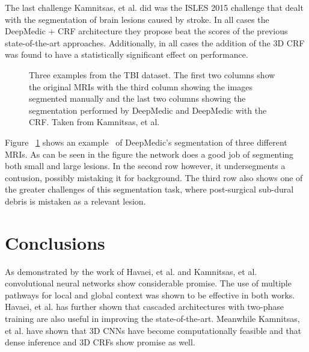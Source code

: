 \documentclass{sig-alternate}
\begin{document}
The last challenge Kamnitsas, et al. did was the ISLES 2015 challenge that dealt with the segmentation of brain lesions caused by stroke. In all cases the DeepMedic + CRF architecture they propose beat the scores of the previous state-of-the-art approaches. Additionally, in all cases the addition of the 3D CRF was found to have a statistically significant effect on performance.

\begin{figure*}
\centering
{}
\caption{Kamnitsas, et al. best performnce versus previous state-of-the-arts (BRATS 2015). The bold numbers indicate a statistically significant difference made by the CRF~\cite{Kamnitsas:2017}.}
\label{fig:KamnitsasResults}
\end{figure*}

\begin{figure}
\centering
{}
\caption{Three examples from the TBI dataset. The first two columns show the original MRIs with the third column showing the images segmented manually and the last two columns showing the segmentation performed by DeepMedic and DeepMedic with the CRF. Taken from Kamnitsas, et al.~\cite{Kamnitsas:2017}}
\label{fig:TBIVisuals}
\end{figure}

Figure ~\ref{fig:TBIVisuals} shows an example~\cite{Kamnitsas:2017} of DeepMedic's segmentation of three different MRIs. As can be seen in the figure the network does a good job of segmenting both small and large lesions. In the second row however, it undersegments a contusion, possibly mistaking it for background. The third row also shows one of the greater challenges of this segmentation task, where post-surgical sub-dural debris is mistaken as a relevant lesion.~\cite{Kamnitsas:2017}

\section{Conclusions}
\label{sec:conclusions}

As demonstrated by the work of Havaei, et al. and Kamnitsas, et al. convolutional neural networks show considerable promise. The use of multiple pathways for local and global context was shown to be effective in both works. Havaei, et al. has further shown that cascaded architectures with two-phase training are also useful in improving the state-of-the-art. Meanwhile Kamnitsas, et al. have shown that 3D CNNs have become computationally feasible and that dense inference and 3D CRFs show promise as well.
\end{document}
